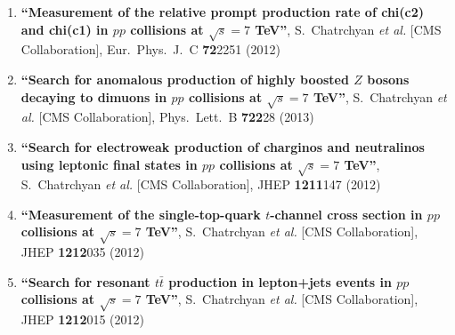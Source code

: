 \begin{enumerate}
\item%
{\bf ``Measurement of the relative prompt production rate of chi(c2) and chi(c1) in $pp$ collisions at $\sqrt{s}=7$ TeV''}, 
  S.~Chatrchyan {\it et al.}  [CMS Collaboration], 
Eur.\ Phys.\ J.\ C {\bf 72}2251 (2012) %


\item%
{\bf ``Search for anomalous production of highly boosted $Z$ bosons decaying to dimuons in $pp$ collisions at $\sqrt{s}=7$ TeV''}, 
  S.~Chatrchyan {\it et al.}  [CMS Collaboration], 
Phys.\ Lett.\ B {\bf 722}28 (2013) %


\item%
{\bf ``Search for electroweak production of charginos and neutralinos using leptonic final states in $pp$ collisions at $\sqrt{s}=7$ TeV''}, 
  S.~Chatrchyan {\it et al.}  [CMS Collaboration], 
JHEP {\bf 1211}147 (2012) %


\item%
{\bf ``Measurement of the single-top-quark $t$-channel cross section in $pp$ collisions at $\sqrt{s}=7$ TeV''}, 
  S.~Chatrchyan {\it et al.}  [CMS Collaboration], 
JHEP {\bf 1212}035 (2012) %


\item%
{\bf ``Search for resonant $t\bar{t}$ production in lepton+jets events in $pp$ collisions at $\sqrt{s}=7$ TeV''}, 
  S.~Chatrchyan {\it et al.}  [CMS Collaboration], 
JHEP {\bf 1212}015 (2012) %



\end{enumerate}
